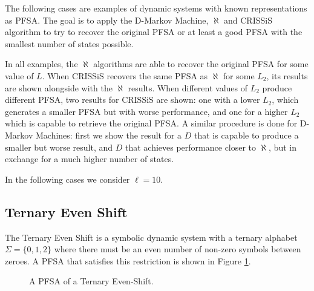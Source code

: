 {The following cases are examples of dynamic systems with known representations as PFSA. The goal is to apply the D-Markov Machine, $\aleph$ and CRISSiS algorithm to try to recover the original PFSA or at least a good PFSA with the smallest number of states possible.

In all examples, the $\aleph$ algorithms are able to recover the original PFSA for some value of $L$. When CRISSiS recovers the same PFSA as $\aleph$ for some $L_2$, its results are shown alongside with the $\aleph$ results.  When different values of $L_2$ produce different PFSA, two results for CRISSiS are shown: one with a lower $L_2$, which generates a smaller PFSA but with worse performance, and one for a higher $L_2$ which is capable to retrieve the original PFSA. A similar procedure is done for D-Markov Machines: first we show the result for a $D$ that is capable to produce a smaller but worse result, and $D$ that achieves performance closer to $\aleph$, but in exchange for a much higher number of states. 

In the following cases we consider $\ell=10$.

\subsection{Ternary Even Shift}

The Ternary Even Shift is a symbolic dynamic system with a ternary alphabet $\Sigma = \{0,1,2\}$ where there must be an even number of non-zero symbols between zeroes. A PFSA that satisfies this restriction is shown in Figure \ref{fig:ternaryeven}. 

\begin{figure}
\centering
{}
\caption{A PFSA of a Ternary Even-Shift.\label{fig:ternaryeven}}
\end{figure}

}
